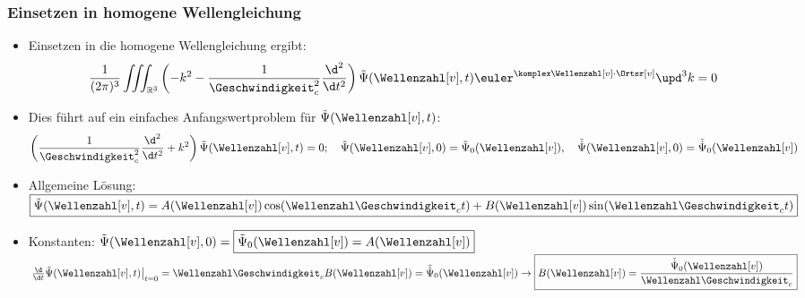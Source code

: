  \begin{frame}
  \frametitle{Einsetzen in homogene Wellengleichung}
  \begin{itemize}[<+->]
  \item Einsetzen in die homogene Wellengleichung ergibt:
    \begin{equation*}
      \frac{1}{(2\pi)^3}\iiint_{\mathbb{R}^3} \left(-k^2 -\frac{1}{\Geschwindigkeit_c^2}\frac{\d^2}{\d t^2}\right)\tilde{\Psi} (\Wellenzahl[v], t) \euler^{\komplex \Wellenzahl[v]\cdot\Ortsr[v]} \upd^3 k = 0 
    \end{equation*}
  \item Dies führt auf ein einfaches Anfangswertproblem für \(\tilde{\Psi} (\Wellenzahl[v], t)\):
    \begin{equation*}
      \left(\frac{1}{\Geschwindigkeit_c^2}\frac{\d^2}{\d t^2} + k^2 \right)\tilde{\Psi} (\Wellenzahl[v], t) =0 ; \quad \tilde{\Psi}(\Wellenzahl[v], 0) = \tilde{\Psi}_0(\Wellenzahl[v]), \quad \tilde{\dot{\Psi}}(\Wellenzahl[v], 0) = \tilde{\dot{\Psi}}_0(\Wellenzahl[v])
    \end{equation*}
    \item Allgemeine Lösung: \(\boxed{\tilde{\Psi} (\Wellenzahl[v], t) = A(\Wellenzahl[v]) \cos(\Wellenzahl\Geschwindigkeit_ct) + B(\Wellenzahl[v]) \sin(\Wellenzahl\Geschwindigkeit_ct)}\)
    \item Konstanten: \( \tilde{\Psi}(\Wellenzahl[v], 0) = \boxed{\tilde{\Psi}_0(\Wellenzahl[v]) = A(\Wellenzahl[v])}\) \\
      \( \left. \frac{\d}{\d t} \tilde{\Psi}(\Wellenzahl[v], t)\right|_{t=0}  = \Wellenzahl\Geschwindigkeit_c B(\Wellenzahl[v]) = \tilde{\dot{\Psi}}_0(\Wellenzahl[v]) \to \boxed{B(\Wellenzahl[v]) = \frac{\tilde{\dot{\Psi}}_0(\Wellenzahl[v])}{\Wellenzahl\Geschwindigkeit_c}}\)
    \end{itemize}
  \end{frame}

